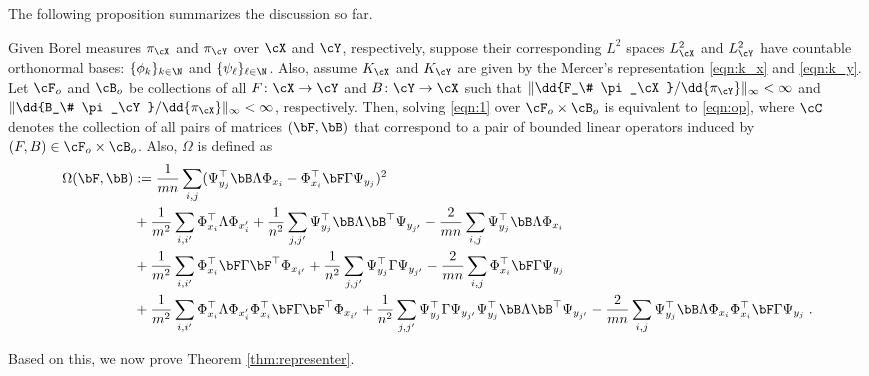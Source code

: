 \documentclass[11pt]{article}
\begin{document}
The following proposition summarizes the discussion so far. 
\begin{proposition}
	\label{prop:representer}
	Given Borel measures $\pi_{\cX}$ and $\pi_{\cY}$ over $\cX$ and $\cY$, respectively, suppose their corresponding $L^2$ spaces $L^2_{\cX}$ and $L^2_{\cY}$ have countable orthonormal bases: $\{\phi_k\}_{k \in \N}$ and $\{\psi_\ell\}_{\ell \in \N}$. Also, assume $K_{\cX}$ and $K_{\cY}$ are given by the Mercer's representation \eqref{eqn:k_x} and \eqref{eqn:k_y}. Let $\cF_o$ and $\cB_o$ be collections of all $F \colon \cX \to \cY$ and $B \colon \cY \to \cX$ such that $\|\dd{F_\# \pi_\cX} / \dd{\pi_\cY}\|_\infty < \infty$ and $\|\dd{B_\# \pi_\cY} / \dd{\pi_\cX}\|_\infty < \infty$, respectively. Then, solving \eqref{eqn:1} over $\cF_o \times \cB_o$ is equivalent to \eqref{eqn:op}, where $\cC$ denotes the collection of all pairs of matrices $(\bF, \bB)$ that correspond to a pair of bounded linear operators induced by $(F, B) \in \cF_o \times \cB_o$. Also, $\Omega$ is defined as 	
	\begin{equation*}
		\begin{split}
			\Omega(\bF, \bB)
			&:=
			\frac{1}{mn} \sum_{i, j} (\Psi_{y_j}^\top \bB \Lambda \Phi_{x_i} - \Phi_{x_i}^\top \bF \Gamma \Psi_{y_j})^2 \\
			&+ 
			\frac{1}{m^2} \sum_{i, i'} \Phi_{x_i}^\top \Lambda \Phi_{x_i'} + \frac{1}{n^2} \sum_{j, j'} \Psi_{y_j}^\top \bB \Lambda \bB^\top \Psi_{y_{j'}} - \frac{2}{m n} \sum_{i, j} \Psi_{y_j}^\top \bB \Lambda \Phi_{x_i} \\
			&+ 
			\frac{1}{m^2} \sum_{i, i'} \Phi_{x_i}^\top \bF \Gamma \bF^\top \Phi_{x_{i'}} + \frac{1}{n^2} \sum_{j, j'} \Psi_{y_j}^\top \Gamma \Psi_{y_{j'}} - \frac{2}{m n} \sum_{i, j} \Phi_{x_i}^\top \bF \Gamma \Psi_{y_j} \\
			&+ 
			\frac{1}{m^2} \sum_{i, i'} \Phi_{x_i}^\top \Lambda \Phi_{x_i'} \Phi_{x_i}^\top \bF \Gamma \bF^\top \Phi_{x_{i'}} + \frac{1}{n^2} \sum_{j, j'} \Psi_{y_j}^\top \Gamma \Psi_{y_{j'}} \Psi_{y_j}^\top \bB \Lambda \bB^\top \Psi_{y_{j'}} - \frac{2}{m n} \sum_{i, j} \Psi_{y_j}^\top \bB \Lambda \Phi_{x_i} \Phi_{x_i}^\top \bF \Gamma \Psi_{y_j} \;.
		\end{split}
	\end{equation*}
\end{proposition}
Based on this, we now prove Theorem \ref{thm:representer}.
\end{document}
